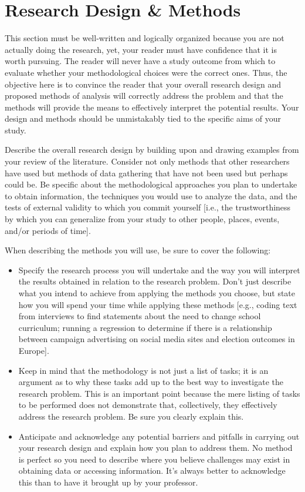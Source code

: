 \documentclass[10pt,twocolumn,letterpaper]{article}
\begin{document}

\section{Research Design \& Methods}
This section must be well-written and logically organized because you are not actually doing the research, yet, your reader must have confidence that it is worth pursuing. The reader will never have a study outcome from which to evaluate whether your methodological choices were the correct ones. Thus, the objective here is to convince the reader that your overall research design and proposed methods of analysis will correctly address the problem and that the methods will provide the means to effectively interpret the potential results. Your design and methods should be unmistakably tied to the specific aims of your study.

Describe the overall research design by building upon and drawing examples from your review of the literature. Consider not only methods that other researchers have used but methods of data gathering that have not been used but perhaps could be. Be specific about the methodological approaches you plan to undertake to obtain information, the techniques you would use to analyze the data, and the tests of external validity to which you commit yourself [i.e., the trustworthiness by which you can generalize from your study to other people, places, events, and/or periods of time].

When describing the methods you will use, be sure to cover the following:
\begin{itemize}
    \item Specify the research process you will undertake and the way you will interpret the results obtained in relation to the research problem. Don't just describe what you intend to achieve from applying the methods you choose, but state how you will spend your time while applying these methods [e.g., coding text from interviews to find statements about the need to change school curriculum; running a regression to determine if there is a relationship between campaign advertising on social media sites and election outcomes in Europe].
    \item Keep in mind that the methodology is not just a list of tasks; it is an argument as to why these tasks add up to the best way to investigate the research problem. This is an important point because the mere listing of tasks to be performed does not demonstrate that, collectively, they effectively address the research problem. Be sure you clearly explain this.
    \item Anticipate and acknowledge any potential barriers and pitfalls in carrying out your research design and explain how you plan to address them. No method is perfect so you need to describe where you believe challenges may exist in obtaining data or accessing information. It's always better to acknowledge this than to have it brought up by your professor.
    \end{itemize}
\end{document}
